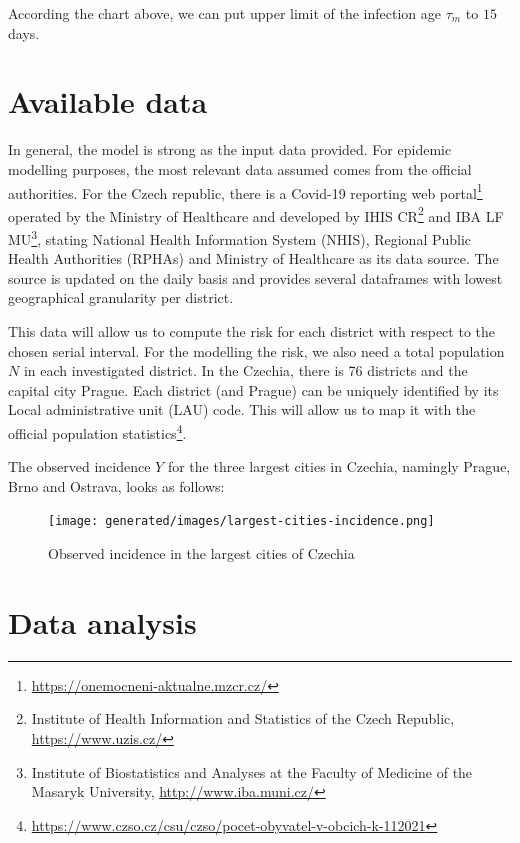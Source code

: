 \documentclass[
  digital, %
  oneside, %
  lof,     %
  lot,     %
]{fithesis4}
\begin{document}
According the chart above, we can put upper limit of the 
infection age $\tau_m$ to $15$ days.

\section{Available data}

In general, the model is strong as the input data provided.
For epidemic modelling purposes, the most relevant data 
assumed comes from the official authorities.
For the Czech republic, there is a Covid-19 reporting web 
portal\footnote{\url{https://onemocneni-aktualne.mzcr.cz/}} operated 
by the Ministry of Healthcare and developed by IHIS CR\footnote{Institute of Health Information and Statistics of the Czech Republic, \url{https://www.uzis.cz/}} 
and IBA LF MU\footnote{Institute of Biostatistics and Analyses at the Faculty of Medicine of the Masaryk University, \url{http://www.iba.muni.cz/}}, 
stating National Health Information System (NHIS), Regional Public 
Health Authorities (RPHAs) and Ministry of Healthcare as its 
data source. 
The source is updated on the daily basis and provides several 
dataframes with lowest geographical granularity per district.

This data will allow us to compute the risk for each district 
with respect to the chosen serial interval. 
For the modelling the risk, we also need a total population 
$N$ in each investigated district.
In the Czechia, there is 76 districts and the capital city Prague. 
Each district (and Prague) can be uniquely identified by its 
Local administrative unit (LAU) code. 
This will allow us to map it with the official population 
statistics\footnote{\url{https://www.czso.cz/csu/czso/pocet-obyvatel-v-obcich-k-112021}}.

The observed incidence $Y$ for the three largest 
cities in Czechia, namingly Prague, Brno and Ostrava, looks as 
follows:

\begin{figure}[h]
  \begin{center}
    \texttt{[image: generated/images/largest-cities-incidence.png]}
  \end{center}
  \caption{Observed incidence in the largest cities of Czechia}
  \label{fig:largest-cities-incidence}
\end{figure}


\section{Data analysis}
\end{document}
